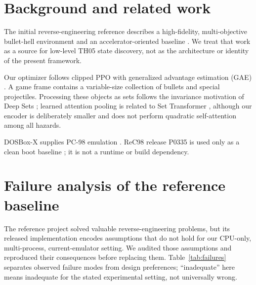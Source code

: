 \documentclass[10pt]{article}
\begin{document}
\section{Background and related work}

The initial reverse-engineering reference describes a high-fidelity,
multi-objective bullet-hell environment and an accelerator-oriented baseline
\cite{liu2026thrl}.  We treat that work as a source for low-level TH05 state
discovery, not as the architecture or identity of the present framework.

Our optimizer follows clipped PPO \cite{schulman2017ppo} with generalized
advantage estimation (GAE) \cite{schulman2015gae}.  A game frame contains a
variable-size collection of bullets and special projectiles.  Processing these
objects as sets follows the invariance motivation of Deep Sets
\cite{zaheer2017deepsets}; learned attention pooling is related to Set
Transformer \cite{lee2019settransformer}, although our encoder is deliberately
smaller and does not perform quadratic self-attention among all hazards.

DOSBox-X supplies PC-98 emulation \cite{dosboxx2026}.  ReC98 release P0335 is
used only as a clean boot baseline \cite{rec98p0335}; it is not a runtime or
build dependency.

\section{Failure analysis of the reference baseline}

The reference project solved valuable reverse-engineering problems, but its
released implementation encodes assumptions that do not hold for our CPU-only,
multi-process, current-emulator setting.  We audited those assumptions and
reproduced their consequences before replacing them.  Table~\ref{tab:failures}
separates observed failure modes from design preferences; ``inadequate'' here
means inadequate for the stated experimental setting, not universally wrong.
\end{document}
